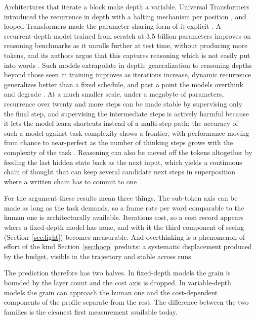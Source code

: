Architectures that iterate a block make depth a variable. Universal Transformers introduced the
recurrence in depth with a halting mechanism per position \citep{dehghani2019}, and looped Transformers
made the parameter-sharing form of it explicit \citep{giannou2023}. A recurrent-depth model trained from
scratch at 3.5 billion parameters improves on reasoning benchmarks as it unrolls further at test time,
without producing more tokens, and its authors argue that this captures reasoning which is not easily
put into words \citep{geiping2025}. Such models extrapolate in depth: generalization to reasoning depths
beyond those seen in training improves as iterations increase, dynamic recurrence generalizes better
than a fixed schedule, and past a point the models overthink and degrade \citep{kohli2026}. At a much
smaller scale, under a megabyte of parameters, recurrence over twenty and more steps can be made stable
by supervising only the final step, and supervising the intermediate steps is actively harmful because it
lets the model learn shortcuts instead of a multi-step path; the accuracy of such a model against task
complexity shows a frontier, with performance moving from chance to near-perfect as the number of
thinking steps grows with the complexity of the task \citep{chen2026}. Reasoning can also be moved off
the tokens altogether by feeding the last hidden state back as the next input, which yields a continuous
chain of thought that can keep several candidate next steps in superposition where a written chain has to
commit to one \citep{hao2024}.

For the argument these results mean three things. The sub-token axis can be made as long as the task
demands, so a frame rate per word comparable to the human one is architecturally available. Iterations
cost, so a cost record appears where a fixed-depth model has none, and with it the third component of
seeing (Section~\ref{sec:light}) becomes measurable. And overthinking is a phenomenon of effort of
the kind Section~\ref{sec:hocp} predicts: a systematic displacement produced by the budget,
visible in the trajectory and stable across runs.

The prediction therefore has two halves. In fixed-depth models the grain is bounded by the layer count
and the cost axis is dropped. In variable-depth models the grain can approach the human one and the
cost-dependent components of the profile separate from the rest. The difference between the two families
is the cleanest first measurement available today.

